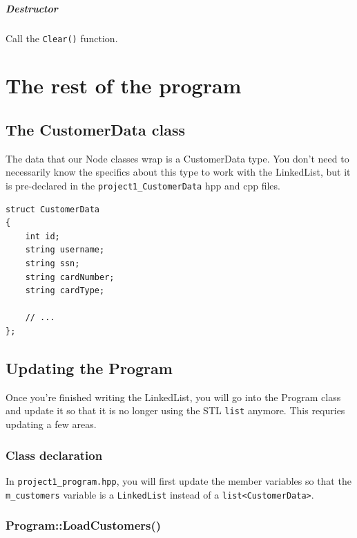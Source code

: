 \documentclass[a4paper,12pt,oneside]{book}
\begin{document}
    \paragraph{Destructor} Call the \texttt{Clear()} function.
    
    \chapter{The rest of the program}
    
    \section{The CustomerData class}
    
    The data that our Node classes wrap is a CustomerData type.
    You don't need to necessarily know the specifics about this
    type to work with the LinkedList, but it is pre-declared
    in the \texttt{project1\_CustomerData} hpp and cpp files.
    
\begin{lstlisting}[style=code]
struct CustomerData
{
    int id;
    string username;
    string ssn;
    string cardNumber;
    string cardType;

    // ...
};
\end{lstlisting} 
    
    \section{Updating the Program}
    
    Once you're finished writing the LinkedList, you will go into the
    Program class and update it so that it is no longer using the
    STL \texttt{list} anymore. This requries updating a few areas.
    
        \subsection{Class declaration}
        
        In \texttt{project1\_program.hpp}, you will first update the member
        variables so that the \texttt{m\_customers} variable is a
        \texttt{LinkedList} instead of a
        \texttt{list<CustomerData>}.
        
        \subsection{Program::LoadCustomers()}
        
\end{document}
